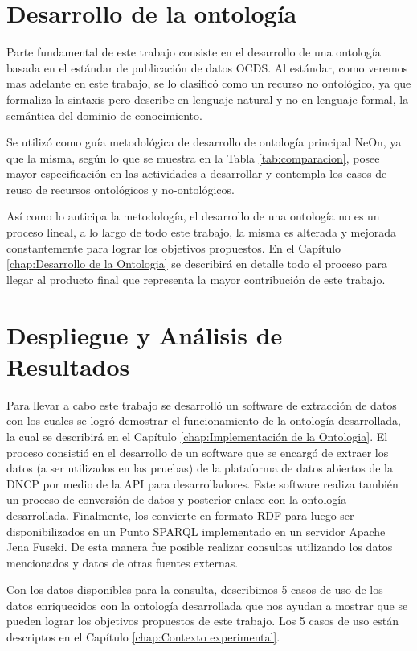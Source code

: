 \section{Desarrollo de la ontología}
\label{section:desarrolloOntologia}

Parte fundamental de este trabajo consiste en el desarrollo de una ontología basada en el estándar de publicación de datos OCDS. Al estándar, como veremos mas adelante en este trabajo, se lo clasificó como un recurso no ontológico, ya que formaliza la sintaxis pero describe en lenguaje natural y no en lenguaje formal, la semántica del dominio de conocimiento. 

Se utilizó como guía metodológica de desarrollo de ontología principal NeOn, ya que la misma, según lo que se muestra en la Tabla  \ref{tab:comparacion}, posee mayor especificación en las actividades a desarrollar  y contempla los casos de reuso de recursos ontológicos y no-ontológicos. 

Así como lo anticipa la metodología, el desarrollo de una ontología no es un proceso lineal, a lo largo de todo este trabajo, la misma es alterada y mejorada constantemente para lograr los objetivos propuestos. En el Capítulo \ref{chap:Desarrollo de la Ontologia} se describirá en detalle todo el proceso para llegar al producto final que representa la mayor contribución de este trabajo.

\section{Despliegue y Análisis de Resultados}
\label{section:despliegue}

Para llevar a cabo este trabajo se desarrolló un software de extracción de datos con los cuales se logró demostrar el funcionamiento de la ontología desarrollada, la cual se describirá en el Capítulo \ref{chap:Implementación de la Ontologia}. El proceso consistió en el desarrollo de un software que se encargó de extraer los datos (a ser utilizados en las pruebas) de la plataforma de datos abiertos de la DNCP por medio de la API para desarrolladores. Este software realiza también un proceso de conversión de datos y posterior enlace con la ontología desarrollada. Finalmente, los convierte en formato RDF para luego ser disponibilizados en un Punto SPARQL implementado en un servidor Apache Jena Fuseki. De esta manera fue posible realizar consultas utilizando los datos mencionados y datos de otras fuentes externas.

Con los datos disponibles para la consulta, describimos 5 casos de uso de los datos enriquecidos con la ontología desarrollada que nos ayudan a mostrar que se pueden lograr los objetivos propuestos de este trabajo. Los 5 casos de uso están descriptos en el Capítulo \ref{chap:Contexto experimental}.

